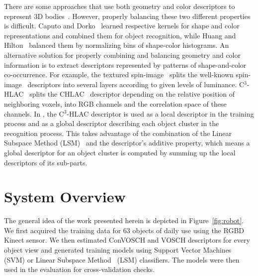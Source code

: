\documentclass[a4paper, 10 pt, conference]{sty/ieeeconf}
\begin{document}
There are some approaches that use both geometry and color descriptors to
represent 3D bodies~\cite{park2006}. However, properly balancing these two
different properties is difficult.  Caputo and Dorko~\cite{caputo2002} learned
respective kernels for shape and color representations and combined them for
object recognition, while Huang and Hilton~\cite{huang2009} balanced them by
normalizing bins of shape-color histograms.  An alternative solution for properly combining
and balancing geometry and color information is to extract descriptors
represented by patterns of shape-and-color co-occurrence.  For example, the textured
spin-image~\cite{cortelazzo2006} splits the well-known
spin-image~\cite{Johnson_spin_images} descriptors into several layers
according to given levels of luminance. C$^3$-HLAC~\cite{kanezaki2011icra} 
splits the CHLAC~\cite{kobayashi2004} descriptor %
depending on the relative position of neighboring voxels, into RGB channels and the correlation 
space of these channels.  
In \cite{kanezaki2011icra}, the C$^3$-HLAC descriptor is used as a local
descriptor in the training process and as a global descriptor describing each
object cluster in the recognition process. This takes advantage of the combination
of the Linear Subspace Method (LSM)~\cite{watanabe1973} and the descriptor's additive property, 
which means a global descriptor for an object cluster is computed by summing up the local descriptors of its sub-parts.

\section{System Overview}
\label{sec:overview}
The general idea of the work presented herein is depicted in 
Figure~\ref{fig:robot}. We first acquired the training data for 63 objects
of daily use using the RGBD Kinect sensor. We then estimated ConVOSCH and VOSCH descriptors 
for every object view and generated training models using Support Vector
Machines~\cite{svm99} (SVM) or Linear Subspace Method~\cite{watanabe1973} (LSM) classifiers. The models were then used
in the evaluation for cross-validation checks.
\end{document}
